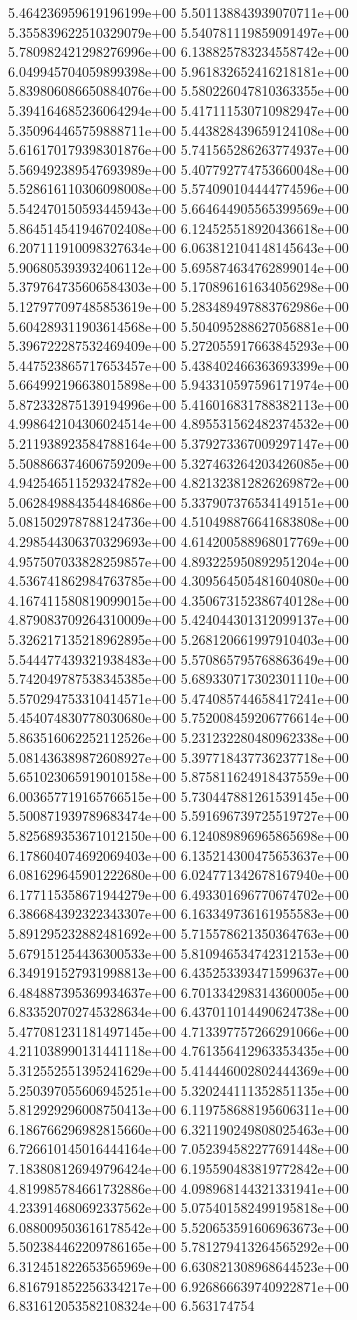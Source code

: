 5.464236959619196199e+00	5.501138843939070711e+00	5.355839622510329079e+00	5.540781119859091497e+00	5.780982421298276996e+00	6.138825783234558742e+00	6.049945704059899398e+00	5.961832652416218181e+00	5.839806086650884076e+00	5.580226047810363355e+00	5.394164685236064294e+00	5.417111530710982947e+00	5.350964465759888711e+00	5.443828439659124108e+00	5.616170179398301876e+00	5.741565286263774937e+00	5.569492389547693989e+00	5.407792774753660048e+00	5.528616110306098008e+00	5.574090104444774596e+00	5.542470150593445943e+00	5.664644905565399569e+00	5.864514541946702408e+00	6.124525518920436618e+00	6.207111910098327634e+00	6.063812104148145643e+00	5.906805393932406112e+00	5.695874634762899014e+00	5.379764735606584303e+00	5.170896161634056298e+00	5.127977097485853619e+00	5.283489497883762986e+00	5.604289311903614568e+00	5.504095288627056881e+00	5.396722287532469409e+00	5.272055917663845293e+00	5.447523865717653457e+00	5.438402466363693399e+00	5.664992196638015898e+00	5.943310597596171974e+00	5.872332875139194996e+00	5.416016831788382113e+00	4.998642104306024514e+00	4.895531562482374532e+00	5.211938923584788164e+00	5.379273367009297147e+00	5.508866374606759209e+00	5.327463264203426085e+00	4.942546511529324782e+00	4.821323812826269872e+00	5.062849884354484686e+00	5.337907376534149151e+00	5.081502978788124736e+00	4.510498876641683808e+00	4.298544306370329693e+00	4.614200588968017769e+00	4.957507033828259857e+00	4.893225950892951204e+00	4.536741862984763785e+00	4.309564505481604080e+00	4.167411580819099015e+00	4.350673152386740128e+00	4.879083709264310009e+00	5.424044301312099137e+00	5.326217135218962895e+00	5.268120661997910403e+00	5.544477439321938483e+00	5.570865795768863649e+00	5.742049787538345385e+00	5.689330717302301110e+00	5.570294753310414571e+00	5.474085744658417241e+00	5.454074830778030680e+00	5.752008459206776614e+00	5.863516062252112526e+00	5.231232280480962338e+00	5.081436389872608927e+00	5.397718437736237718e+00	5.651023065919010158e+00	5.875811624918437559e+00	6.003657719165766515e+00	5.730447881261539145e+00	5.500871939789683474e+00	5.591696739725519727e+00	5.825689353671012150e+00	6.124089896965865698e+00	6.178604074692069403e+00	6.135214300475653637e+00	6.081629645901222680e+00	6.024771342678167940e+00	6.177115358671944279e+00	6.493301696770674702e+00	6.386684392322343307e+00	6.163349736161955583e+00	5.891295232882481692e+00	5.715578621350364763e+00	5.679151254436300533e+00	5.810946534742312153e+00	6.349191527931998813e+00	6.435253393471599637e+00	6.484887395369934637e+00	6.701334298314360005e+00	6.833520702745328634e+00	6.437011014490624738e+00	5.477081231181497145e+00	4.713397757266291066e+00	4.211038990131441118e+00	4.761356412963353435e+00	5.312552551395241629e+00	5.414446002802444369e+00	5.250397055606945251e+00	5.320244111352851135e+00	5.812929296008750413e+00	6.119758688195606311e+00	6.186766296982815660e+00	6.321190249808025463e+00	6.726610145016444164e+00	7.052394582277691448e+00	7.183808126949796424e+00	6.195590483819772842e+00	4.819985784661732886e+00	4.098968144321331941e+00	4.233914680692337562e+00	5.075401582499195818e+00	6.088009503616178542e+00	5.520653591606963673e+00	5.502384462209786165e+00	5.781279413264565292e+00	6.312451822653565969e+00	6.630821308968644523e+00	6.816791852256334217e+00	6.926866639740922871e+00	6.831612053582108324e+00	6.563174754